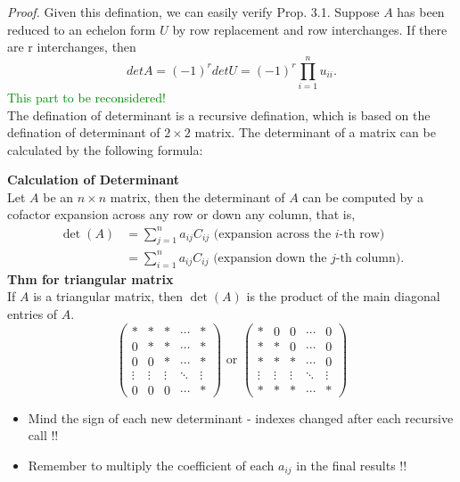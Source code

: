 \documentclass[10pt, a4paper]{article}
\begin{document}
\indent\textit{Proof.} Given this defination, we can easily verify Prop. 3.1. Suppose $A$ has been reduced to an echelon form $U$ by row replacement and row interchanges. If there are r interchanges, then $$
det A = (-1)^r det U = (-1)^r \prod_{i=1}^n u_{ii}.
$$
\textcolor{Green}{This part to be reconsidered!}\\
The defination of determinant is a recursive defination, which is based on the defination of determinant of $2\times 2$ matrix. The determinant of a matrix can be calculated by the following formula:
\begin{proposition}
    \textbf{Calculation of Determinant}\\
    Let $A$ be an $n\times n$ matrix, then the determinant of $A$ can be computed by a cofactor expansion across any row or down any column, that is, 
    \begin{align*}
        \det(A) & = \sum_{j=1}^n a_{ij}C_{ij} \text{ (expansion across the $i$-th row)} \\
                & = \sum_{i=1}^n a_{ij}C_{ij} \text{ (expansion down the $j$-th column)}.
    \end{align*}
    \textbf{Thm for triangular matrix}\\
    If $A$ is a triangular matrix, then $\det(A)$ is the product of the main diagonal entries of $A$.\[
        \begin{pmatrix}
            * & * & * &  \cdots & * \\
            0 & * & * & \cdots & * \\
            0 & 0 & * & \cdots & * \\
            \vdots & \vdots & \vdots & \ddots & \vdots \\
            0 & 0 & 0 & \cdots & *
        \end{pmatrix}
        \text{ or }
        \begin{pmatrix}
            * & 0 & 0 &  \cdots & 0 \\
            * & * & 0 & \cdots & 0 \\
            * & * & * & \cdots & 0 \\
            \vdots & \vdots & \vdots & \ddots & \vdots \\
            * & * & * & \cdots & *
        \end{pmatrix}
    \]
    \begin{itemize}
        \item Mind the sign of each new determinant - indexes changed after each recursive call !!
        \item Remember to multiply the coefficient of each $a_{ij}$ in the final results !!
    \end{itemize}
    
\end{proposition}
\end{document}
